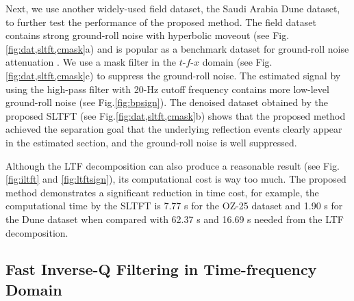 
Next, we use another widely-used field dataset, the Saudi Arabia Dune
dataset, to further test the performance of the proposed method. The
field dataset contains strong ground-roll noise with hyperbolic
moveout (see Fig.\ref{fig:dat,sltft,cmask}a) and is popular as a benchmark
dataset for ground-roll noise
attenuation \cite[]{Fomel02,Zheng2022,kaur2020,Yang2024}. We use a
mask filter in the $t\textrm{-}f\textrm{-}x$ domain (see
Fig.\ref{fig:dat,sltft,cmask}c) to suppress the ground-roll noise. The
estimated signal by using the high-pass filter with 20-Hz cutoff
frequency contains more low-level ground-roll noise (see
Fig.\ref{fig:bpsign}). The denoised dataset obtained by the
proposed SLTFT (see Fig.\ref{fig:dat,sltft,cmask}b) shows that the proposed
method achieved the separation goal that the underlying reflection
events clearly appear in the estimated section, and the ground-roll
noise is well suppressed.

Although the LTF decomposition can also produce a reasonable result
(see Fig.\ref{fig:iltft} and \ref{fig:ltftsign}), its
computational cost is way too much. The proposed method demonstrates a
significant reduction in time cost, for example, the computational
time by the SLTFT is 7.77 s for the OZ-25 dataset and 1.90 s for the
Dune dataset when compared with 62.37 s and 16.69 s needed from the
LTF decomposition.



\subsection{Fast Inverse-Q Filtering in Time-frequency Domain}

